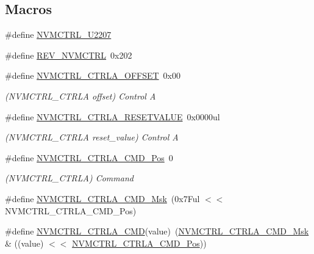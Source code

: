\subsection*{Macros}
\begin{DoxyCompactItemize}
\item 
\#define \mbox{\hyperlink{group___s_a_m_d21___n_v_m_c_t_r_l_ga3ea48740d5f4e1f68a7dd06753eb20d5}{N\+V\+M\+C\+T\+R\+L\+\_\+\+U2207}}
\item 
\#define \mbox{\hyperlink{group___s_a_m_d21___n_v_m_c_t_r_l_gad91d0ed581519e0bb057ede9db891e87}{R\+E\+V\+\_\+\+N\+V\+M\+C\+T\+RL}}~0x202
\item 
\#define \mbox{\hyperlink{group___s_a_m_d21___n_v_m_c_t_r_l_ga4853195148a26c13e84af06b27099a5a}{N\+V\+M\+C\+T\+R\+L\+\_\+\+C\+T\+R\+L\+A\+\_\+\+O\+F\+F\+S\+ET}}~0x00
\begin{DoxyCompactList}\small\item\em (N\+V\+M\+C\+T\+R\+L\+\_\+\+C\+T\+R\+LA offset) Control A \end{DoxyCompactList}\item 
\#define \mbox{\hyperlink{group___s_a_m_d21___n_v_m_c_t_r_l_gafda7d874f8e5f91f9590105c7bc984b5}{N\+V\+M\+C\+T\+R\+L\+\_\+\+C\+T\+R\+L\+A\+\_\+\+R\+E\+S\+E\+T\+V\+A\+L\+UE}}~0x0000ul
\begin{DoxyCompactList}\small\item\em (N\+V\+M\+C\+T\+R\+L\+\_\+\+C\+T\+R\+LA reset\+\_\+value) Control A \end{DoxyCompactList}\item 
\#define \mbox{\hyperlink{group___s_a_m_d21___n_v_m_c_t_r_l_ga5346c6f8ba695f7cadb7f07bde6e25f8}{N\+V\+M\+C\+T\+R\+L\+\_\+\+C\+T\+R\+L\+A\+\_\+\+C\+M\+D\+\_\+\+Pos}}~0
\begin{DoxyCompactList}\small\item\em (N\+V\+M\+C\+T\+R\+L\+\_\+\+C\+T\+R\+LA) Command \end{DoxyCompactList}\item 
\#define \mbox{\hyperlink{group___s_a_m_d21___n_v_m_c_t_r_l_ga0d19f301cea0ef37b638f1961a1abae9}{N\+V\+M\+C\+T\+R\+L\+\_\+\+C\+T\+R\+L\+A\+\_\+\+C\+M\+D\+\_\+\+Msk}}~(0x7\+Ful $<$$<$ N\+V\+M\+C\+T\+R\+L\+\_\+\+C\+T\+R\+L\+A\+\_\+\+C\+M\+D\+\_\+\+Pos)
\item 
\#define \mbox{\hyperlink{group___s_a_m_d21___n_v_m_c_t_r_l_ga1dd6561aa8e0944fda54ac91591a7672}{N\+V\+M\+C\+T\+R\+L\+\_\+\+C\+T\+R\+L\+A\+\_\+\+C\+MD}}(value)~(\mbox{\hyperlink{group___s_a_m_d21___n_v_m_c_t_r_l_ga0d19f301cea0ef37b638f1961a1abae9}{N\+V\+M\+C\+T\+R\+L\+\_\+\+C\+T\+R\+L\+A\+\_\+\+C\+M\+D\+\_\+\+Msk}} \& ((value) $<$$<$ \mbox{\hyperlink{group___s_a_m_d21___n_v_m_c_t_r_l_ga5346c6f8ba695f7cadb7f07bde6e25f8}{N\+V\+M\+C\+T\+R\+L\+\_\+\+C\+T\+R\+L\+A\+\_\+\+C\+M\+D\+\_\+\+Pos}}))

\end{DoxyCompactItemize}
